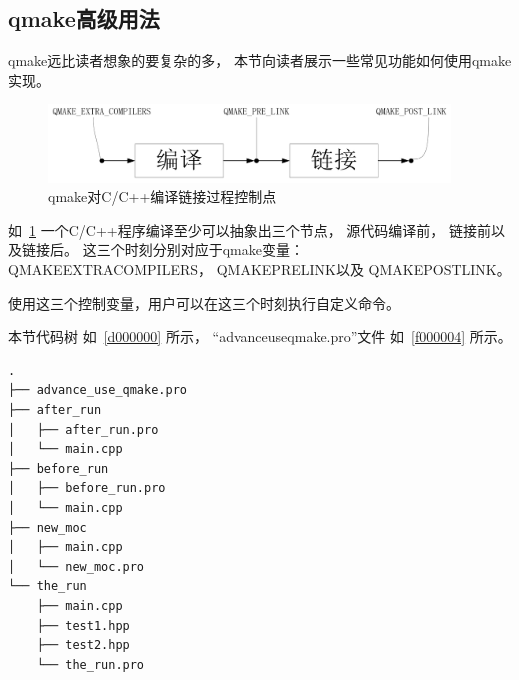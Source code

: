 \FloatBarrier
\subsection{
qmake高级用法
}\label{ss000810}


qmake远比读者想象的要复杂的多，
本节向读者展示一些常见功能如何使用qmake实现。


\begin{figure}[htb] %
\centering %
\includegraphics[width=0.95\textwidth]{chapter01/images/advance_use_qmake.png} %
\caption{qmake对C/C{\sourcefonttwo{}+}{\sourcefonttwo{}+}编译链接过程控制点} %
\label{p000002} %
\end{figure}


如\figurename\ \ref{p000002}
一个C/C{\sourcefonttwo{}+}{\sourcefonttwo{}+}程序编译至少可以抽象出三个节点，
源代码编译前，
链接前以及链接后。
这三个时刻分别对应于qmake变量：
QMAKE\underline{\hspace{0.5em}}EXTRA\underline{\hspace{0.5em}}COMPILERS，
QMAKE\underline{\hspace{0.5em}}PRE\underline{\hspace{0.5em}}LINK以及
QMAKE\underline{\hspace{0.5em}}POST\underline{\hspace{0.5em}}LINK。

使用这三个控制变量，用户可以在这三个时刻执行自定义命令。

本节代码树
如\treeindexnumbernameone\ \ref{d000000}
所示，
“advance\underline{\hspace{0.5em}}use\underline{\hspace{0.5em}}qmake.pro”文件
如\lstlistingname\ \ref{f000004}
所示。

\FloatBarrier
{}\label{d000000}    %
\begin{lstlisting}[caption=GoodLuck,
numbers=none,
title=\treeindexnumbernameone \thetreeindexnumber
]
.
├── advance_use_qmake.pro
├── after_run
│   ├── after_run.pro
│   └── main.cpp
├── before_run
│   ├── before_run.pro
│   └── main.cpp
├── new_moc
│   ├── main.cpp
│   └── new_moc.pro
└── the_run
    ├── main.cpp
    ├── test1.hpp
    ├── test2.hpp
    └── the_run.pro
\end{lstlisting}          %

